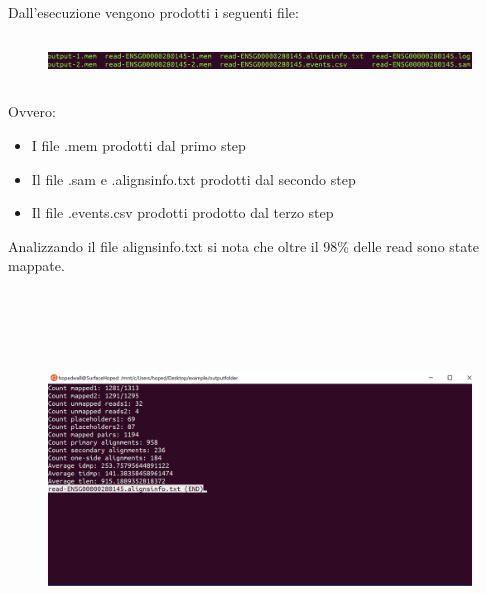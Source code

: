 Dall'esecuzione vengono prodotti i seguenti file:

\begin{figure}[h!]
	\centering
	\includegraphics[width=\linewidth,height=1.25cm]{images/fileprodotti.png}
  \label{fig:ProducedFiles}
\end{figure}

Ovvero:

\begin{itemize}
	\item I file .mem prodotti dal primo step
	\item Il file .sam e .alignsinfo.txt prodotti dal secondo step
	\item	Il file .events.csv prodotti prodotto dal terzo step
\end{itemize}

%
%

Analizzando il file alignsinfo.txt si nota che oltre il 98\% delle read sono state mappate.

\begin{figure}[h!]
	\centering
	\includegraphics[width=\linewidth,height=10cm]{images/alignsinfotxt.png}
  \label{fig:AlignsInfoExperiment}
\end{figure}

